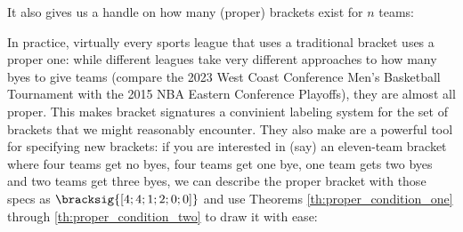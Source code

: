 {It also gives us a handle on how many (proper) brackets exist for $n$ teams:


In practice, virtually every sports league that uses a traditional bracket uses a proper one: while different leagues take very different approaches to how many byes to give teams (compare the 2023 West Coast Conference Men's Basketball Tournament with the 2015 NBA Eastern Conference
Playoffs), they are almost all proper. This makes bracket signatures a convinient labeling system for the set of brackets that we might reasonably encounter. They also make are a powerful tool for specifying new brackets: if you are interested in (say) an eleven-team bracket where four teams get no byes, four teams get one bye, one team gets two byes and two teams get three byes, we can describe the proper bracket with those specs as $\bracksig{[4; 4; 1; 2; 0; 0]}$ and use Theorems \ref{th:proper_condition_one} through \ref{th:proper_condition_two} to draw it with ease:

}